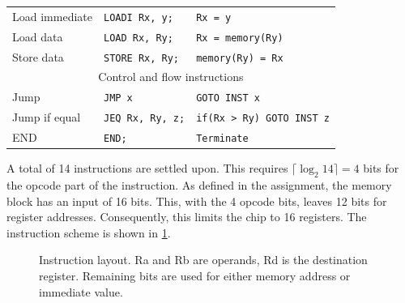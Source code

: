 \documentclass[a4paper, english]{article}
\numberwithin{equation}{section}
\begin{document}
\begin{table}
\begin{tabular}{lll}
        \midrule
        Load immediate           & \texttt{LOADI Rx, y;}    & \texttt{Rx = y}                  \\
        Load data                & \texttt{LOAD Rx, Ry;}    & \texttt{Rx = memory(Ry)}         \\
        Store data               & \texttt{STORE Rx, Ry;}   & \texttt{memory(Ry) = Rx}         \\
        \midrule
        \multicolumn{3}{c}{Control and flow instructions}                                      \\
        \midrule
        Jump                     & \texttt{JMP x}           & \texttt{GOTO INST x}             \\
        Jump if equal            & \texttt{JEQ Rx, Ry, z;}  & \texttt{if(Rx > Ry) GOTO INST z} \\
        END                      & \texttt{END;}            & \texttt{Terminate}               \\
        \bottomrule
    \end{tabular}
\end{table}
A total of 14 instructions are settled upon. This requires \(\lceil \log_2{14} \rceil = 4\) bits for the opcode part of the instruction. As defined in the assignment, the memory block has an input of 16 bits. This, with the 4 opcode bits, leaves 12 bits for register addresses. Consequently, this limits the chip to 16 registers. The instruction scheme is shown in \cref{fig:inst}.
\begin{figure}
    \centering
    \centering
    \caption{Instruction layout. Ra and Rb are operands, Rd is the destination register. Remaining bits are used for either memory address or immediate value.}\label{fig:inst}
\end{figure}
\end{document}
